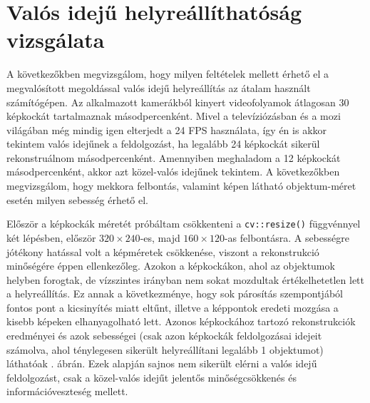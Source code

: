 \section{Valós idejű helyreállíthatóság vizsgálata}

A következőkben megvizsgálom, hogy milyen feltételek mellett érhető el a megvalósított megoldással valós idejű helyreállítás az átalam használt számítógépen. Az alkalmazott kamerákból kinyert videofolyamok átlagosan 30 képkockát tartalmaznak másodpercenként. Mivel a televíziózásban és a mozi világában még mindig igen elterjedt a 24 FPS használata, így én is akkor tekintem valós idejűnek a feldolgozást, ha legalább 24 képkockát sikerül rekonstruálnom másodpercenként. Amennyiben meghaladom a 12 képkockát másodpercenként, akkor azt közel-valós idejűnek tekintem. A következőkben megvizsgálom, hogy mekkora felbontás, valamint képen látható objektum-méret esetén milyen sebesség érhető el.

Először a képkockák méretét próbáltam csökkenteni a \texttt{cv::resize()} függvénnyel két lépésben, először $320\times 240$-es, majd $160\times 120$-as felbontásra. A sebességre jótékony hatással volt a képméretek csökkenése, viszont a rekonstrukció minőségére éppen ellenkezőleg. Azokon a képkockákon, ahol az objektumok helyben forogtak, de vízszintes irányban nem sokat mozdultak értékelhetetlen lett a helyreállítás. Ez annak a következménye, hogy sok párosítás szempontjából fontos pont a kicsinyítés miatt eltűnt, illetve a képpontok eredeti mozgása a kisebb képeken elhanyagolható lett. Azonos képkockához tartozó rekonstrukciók eredményei és azok sebességei (csak azon képkockák feldolgozásai idejeit számolva, ahol ténylegesen sikerült helyreállítani legalább 1 objektumot) láthatóak . ábrán. Ezek alapján sajnos nem sikerült elérni a valós idejű feldolgozást, csak a közel-valós idejűt jelentős minőségcsökkenés és információveszteség mellett.

